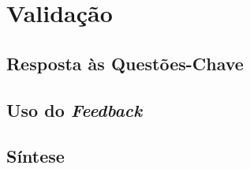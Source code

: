\chapter{Validação}
\label{chap:Chapter6}
\tbd

\section{Resposta às Questões-Chave}
\label{sec:chap06_answers}
\tbd

\section{Uso do \textit{Feedback}}
\label{sec:chap06_feedback_usage}
\tbd

\section{Síntese}
\label{sec:chap06_chaptersummary}
\tbd
